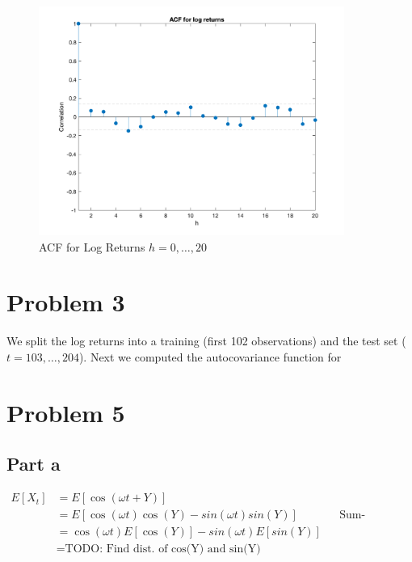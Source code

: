 \documentclass{article}
\begin{document}
\begin{figure}[H]
\includegraphics[width=10cm]{plots/acf_log_returns.png}
\centering
\caption{ACF for Log Returns $h = 0,\ldots, 20$}
\label{fig:acf_log}
\end{figure}

\section*{Problem 3}
We split the log returns into a training (first 102 observations) and the test set ($t = 103,\ldots, 204$).
Next we computed the autocovariance function for 

\section*{Problem 5}
\subsection*{Part a}
\begin{align*}
    E[X_t] &= E[\cos(\omega t + Y)]\\
    &= E[\cos(\omega t) \cos(Y) - sin(\omega t) sin(Y)] && \text{Sum-difference for cos}\\
    &= \cos(\omega t) E[\cos(Y)] - sin(\omega t) E[sin(Y)]\\
    &= \text{TODO: Find dist. of cos(Y) and sin(Y)}
\end{align*}



\end{document}
